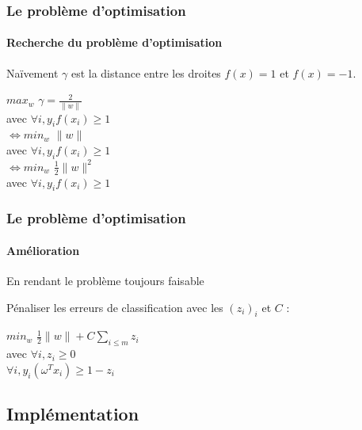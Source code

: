 \documentclass{beamer}
\begin{document}
\begin{frame}
\frametitle{Le problème d'optimisation}
\framesubtitle{Recherche du problème d'optimisation}

\begin{block}{Naïvement}
$\gamma$ est la distance entre les droites $f(x) = 1$ et $f(x) = -1$.

      \begin{center}
        $max_{w}$ $\gamma = \frac{2}{\|w\|}$\\
        avec $\forall i, y_i f(x_i) \geq 1$\\

       \bigskip
        $\Leftrightarrow min_{w}$ $\|w\|$ \\
        avec $\forall i, y_i f(x_i) \geq 1$\\
       \bigskip
        $\Leftrightarrow min_{w}$ $\frac{1}{2} \|w\|^2$\\
        avec $\forall i, y_i f(x_i) \geq 1$\\
      \end{center}

\end{block}

\end{frame}

\begin{frame}
\frametitle{Le problème d'optimisation}
\framesubtitle{Amélioration}

\begin{block}{En rendant le problème toujours faisable}

Pénaliser les erreurs de classification avec les $(z_i)_i$ et $C$ :

           \begin{center}
           $min_{w}$ $\frac{1}{2} \|w\| + C \sum_{i \leq m}z_i$\\
           avec $\forall i, z_i \geq 0$\\
           $\forall i, y_i (\omega^{T} x_i) \geq 1 - z_i$\\
           \end{center}

\end{block}

\end{frame}

\subsection{Implémentation}

\begin{frame}
\tableofcontents[currentsubsection]
\end{frame}
\end{document}
